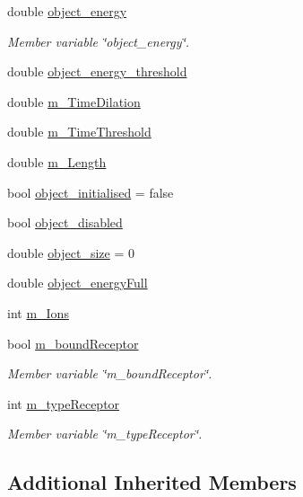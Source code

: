 \begin{DoxyCompactItemize}
double \mbox{\hyperlink{classNeuroreceptor_a80028c9ce2c6146d9b9df7bd66ac431e}{object\+\_\+energy}}
\begin{DoxyCompactList}\small\item\em Member variable \char`\"{}object\+\_\+energy\char`\"{}. \end{DoxyCompactList}\item 
double \mbox{\hyperlink{classNeuroreceptor_a314c6c2312e947d17c1159806c6fbd60}{object\+\_\+energy\+\_\+threshold}}
\item 
double \mbox{\hyperlink{classNeuroreceptor_aed2feaadd9a22823d58d0b3dfbb99f4e}{m\+\_\+\+Time\+Dilation}}
\item 
double \mbox{\hyperlink{classNeuroreceptor_a2f9a114bc07e75721dde5f8ec0d94944}{m\+\_\+\+Time\+Threshold}}
\item 
double \mbox{\hyperlink{classNeuroreceptor_a2633c2cb6dbeb3aa0d0a6a71ea1235fa}{m\+\_\+\+Length}}
\item 
bool \mbox{\hyperlink{classNeuroreceptor_a31a18ad0a083d4d9b40bb4ad3eb45458}{object\+\_\+initialised}} = false
\item 
bool \mbox{\hyperlink{classNeuroreceptor_ad7cec01383ddbdfce87ed5510703d21b}{object\+\_\+disabled}}
\item 
double \mbox{\hyperlink{classNeuroreceptor_abfff414d8cd3e762fd73f303908fdb03}{object\+\_\+size}} = 0
\item 
double \mbox{\hyperlink{classNeuroreceptor_a51c4fde4d12804418451b1e3212d3b9e}{object\+\_\+energy\+Full}}
\item 
int \mbox{\hyperlink{classNeuroreceptor_a78a8356b686482232ccb9e65ed733c12}{m\+\_\+\+Ions}}
\item 
bool \mbox{\hyperlink{classNeuroreceptor_add9d0f75226881200221d886bcdcc6ab}{m\+\_\+bound\+Receptor}}
\begin{DoxyCompactList}\small\item\em Member variable \char`\"{}m\+\_\+bound\+Receptor\char`\"{}. \end{DoxyCompactList}\item 
int \mbox{\hyperlink{classNeuroreceptor_a1bd49f13829d154ecd9b91488bd63035}{m\+\_\+type\+Receptor}}
\begin{DoxyCompactList}\small\item\em Member variable \char`\"{}m\+\_\+type\+Receptor\char`\"{}. \end{DoxyCompactList}\end{DoxyCompactItemize}
\subsection*{Additional Inherited Members}


